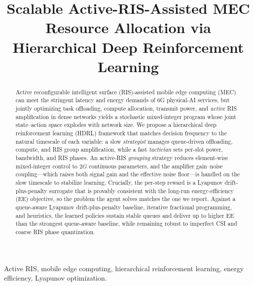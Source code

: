 \documentclass[conference]{IEEEtran}
\begin{document}
\title{Scalable Active-RIS-Assisted MEC Resource Allocation via Hierarchical Deep Reinforcement Learning}

\author{
}

\maketitle

\begin{abstract}
Active reconfigurable intelligent surface (RIS)-assisted mobile edge computing
(MEC) can meet the stringent latency and energy demands of 6G physical-AI
services, but jointly optimizing task offloading, compute allocation, transmit
power, and \emph{active} RIS amplification in dense networks yields a stochastic
mixed-integer program whose joint state--action space explodes with network
size. We propose a hierarchical deep reinforcement learning (HDRL) framework that
matches decision frequency to the natural timescale of each variable: a slow
\emph{strategist} manages queue-driven offloading, compute, and RIS group
amplification, while a fast \emph{tactician} sets per-slot power, bandwidth, and
RIS phases. An active-RIS \emph{grouping} strategy reduces element-wise
mixed-integer control to $2G$ continuous parameters, and the amplifier
gain--noise coupling---which raises both signal gain and the effective noise
floor---is handled on the slow timescale to stabilize learning. Crucially, the
per-step reward is a Lyapunov drift-plus-penalty surrogate that is provably
consistent with the long-run energy-efficiency (EE) objective, so the problem the
agent solves matches the one we report. Against a queue-aware Lyapunov
drift-plus-penalty baseline, iterative fractional programming, and heuristics, the
learned policies sustain stable queues and deliver up to \eeGainPct{} higher EE than
the strongest queue-aware baseline, while remaining robust to imperfect CSI and
coarse RIS phase quantization.
\end{abstract}

\begin{IEEEkeywords}
Active RIS, mobile edge computing, hierarchical reinforcement learning, energy
efficiency, Lyapunov optimization.
\end{IEEEkeywords}
\end{document}
